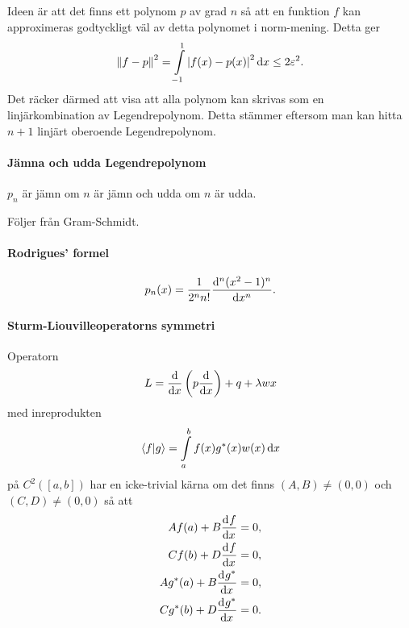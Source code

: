 \proof
Ideen är att det finns ett polynom $p$ av grad $n$ så att en funktion $f$ kan approximeras godtyckligt väl av detta polynomet i norm-mening. Detta ger
\begin{align*}
	\norm{f - p}^{2} = \int\limits_{-1}^{1}\abs{f(x) - p(x)}^{2}\dd{x} \leq 2\varepsilon^{2}.
\end{align*}
Det räcker därmed att visa att alla polynom kan skrivas som en linjärkombination av Legendrepolynom. Detta stämmer eftersom man kan hitta $n + 1$ linjärt oberoende Legendrepolynom.

\paragraph{Jämna och udda Legendrepolynom}
$p_{n}$ är jämn om $n$ är jämn och udda om $n$ är udda.

\proof
Följer från Gram-Schmidt.

\paragraph{Rodrigues' formel}
\begin{align*}
	p_{n}(x) = \frac{1}{2^{n}n!}\dv[n]{(x^{2} - 1) ^{n}}{x}.
\end{align*}

\proof

\paragraph{Sturm-Liouvilleoperatorns symmetri}
Operatorn
\begin{align*}
	L = \dv{x}\left(p\dv{x}\right) + q + \lambda wx
\end{align*}
med inreprodukten
\begin{align*}
	\bra{f}\ket{g} = \int\limits_{a}^{b}f(x)g^{*}(x)w(x)\dd{x}
\end{align*}
på $C^{2}([a, b])$ har en icke-trivial kärna om det finns $(A, B) \neq (0, 0)$ och $(C, D) \neq (0, 0)$ så att
\begin{align*}
	Af(a) + B\dv[]{f}{x} (a) = 0, \\
	Cf(b) + D\dv[]{f}{x} (b) = 0, \\
	Ag^{*}(a) + B\dv[]{g^{*}}{x} (a) = 0, \\
	Cg^{*}(b) + D\dv[]{g^{*}}{x} (b) = 0.
\end{align*}

